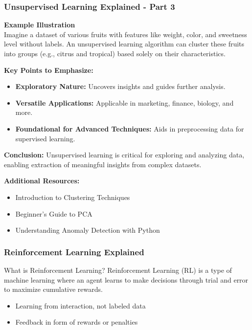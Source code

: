 \documentclass[aspectratio=169]{beamer}
\begin{document}
\begin{frame}[fragile]
    \frametitle{Unsupervised Learning Explained - Part 3}
    \textbf{Example Illustration} \\
    Imagine a dataset of various fruits with features like weight, color, and sweetness level without labels. An unsupervised learning algorithm can cluster these fruits into groups (e.g., citrus and tropical) based solely on their characteristics.

    \textbf{Key Points to Emphasize:}
    \begin{itemize}
        \item \textbf{Exploratory Nature:} Uncovers insights and guides further analysis.
        \item \textbf{Versatile Applications:} Applicable in marketing, finance, biology, and more.
        \item \textbf{Foundational for Advanced Techniques:} Aids in preprocessing data for supervised learning.
    \end{itemize}

    \textbf{Conclusion:} Unsupervised learning is critical for exploring and analyzing data, enabling extraction of meaningful insights from complex datasets.

    \textbf{Additional Resources:}
    \begin{itemize}
        \item Introduction to Clustering Techniques
        \item Beginner's Guide to PCA
        \item Understanding Anomaly Detection with Python
    \end{itemize}
\end{frame}

\begin{frame}[fragile]
    \frametitle{Reinforcement Learning Explained}
    \begin{block}{What is Reinforcement Learning?}
        Reinforcement Learning (RL) is a type of machine learning where an agent learns to make decisions through trial and error to maximize cumulative rewards.
        \begin{itemize}
            \item Learning from interaction, not labeled data
            \item Feedback in form of rewards or penalties
        \end{itemize}
    \end{block}
\end{frame}
\end{document}
